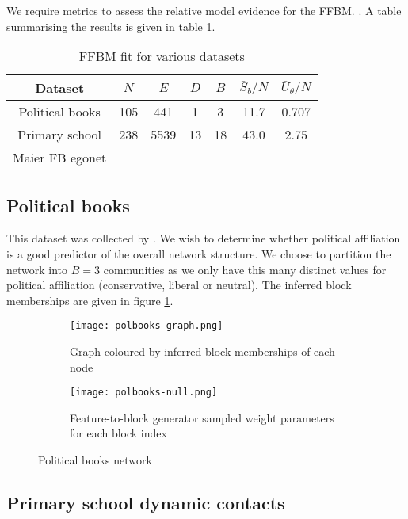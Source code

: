 We require metrics to assess the relative model evidence for the FFBM. . A table summarising the results is given in table \ref{tab:results}.

\begin{table}[!h]
	\centering
	\caption{FFBM fit for various datasets}
	\label{tab:results}
	\begin{tabular}{c|ccc|c|cc}
		Dataset & $N$ & $E$ & $D$ & $B$ & $\bar{S}_b /N$ & $\bar{U}_\theta /N$ \\ \hline
		Political books & 105  & 441 & 1 & 3 & 11.7 & 0.707 \\
		Primary school & 238 & 5539 & 13 &  18 & 43.0  & 2.75 \\
		Maier FB egonet &  &     &     &   &           &             \\
		       
	\end{tabular}
\end{table}


\subsection{Political books}

This dataset was collected by \citet{polbooks}. We wish to determine whether political affiliation is a good predictor of the overall network structure. We choose to partition the network into $B=3$ communities as we only have this many distinct values for political affiliation (conservative, liberal or neutral). The inferred block memberships are given in figure \ref{fig:books-graph}.

\begin{figure}[!h]
	\centering
	\begin{subfigure}{0.3\linewidth}
		\centering
		\texttt{[image: polbooks-graph.png]}
		\caption{Graph coloured by inferred block memberships of each node}
		\label{fig:books-graph}
	\end{subfigure}
	\hfill
	\begin{subfigure}{0.5\linewidth}
		\centering
		\texttt{[image: polbooks-null.png]}
		\caption{Feature-to-block generator sampled weight parameters for each block index}
		\label{fig:book-null}
	\end{subfigure}
	\caption{Political books network}
\end{figure}

\subsection{Primary school dynamic contacts}

